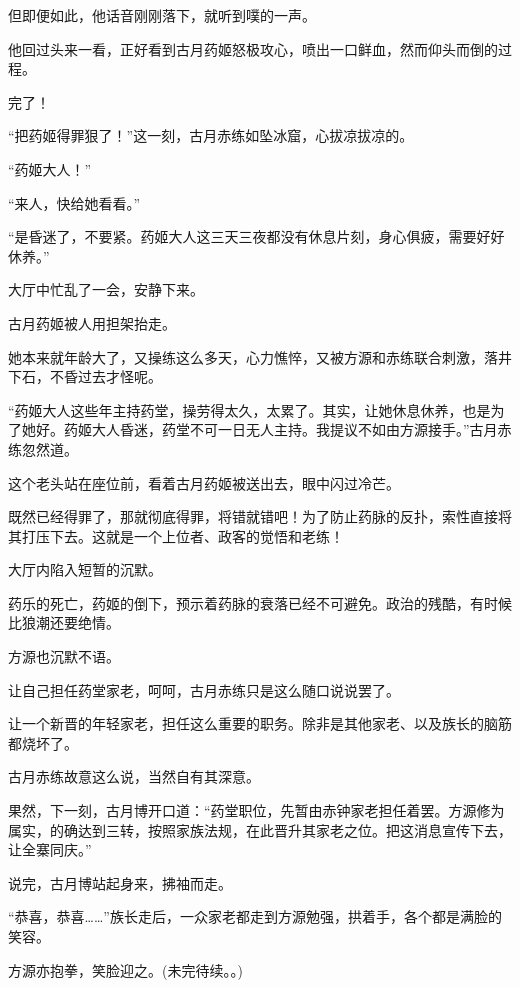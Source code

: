 \begin{this_body}
但即便如此，他话音刚刚落下，就听到噗的一声。

他回过头来一看，正好看到古月药姬怒极攻心，喷出一口鲜血，然而仰头而倒的过程。

完了！

“把药姬得罪狠了！”这一刻，古月赤练如坠冰窟，心拔凉拔凉的。

“药姬大人！”

“来人，快给她看看。”

“是昏迷了，不要紧。药姬大人这三天三夜都没有休息片刻，身心俱疲，需要好好休养。”

大厅中忙乱了一会，安静下来。

古月药姬被人用担架抬走。

她本来就年龄大了，又操练这么多天，心力憔悴，又被方源和赤练联合刺激，落井下石，不昏过去才怪呢。

“药姬大人这些年主持药堂，操劳得太久，太累了。其实，让她休息休养，也是为了她好。药姬大人昏迷，药堂不可一日无人主持。我提议不如由方源接手。”古月赤练忽然道。

这个老头站在座位前，看着古月药姬被送出去，眼中闪过冷芒。

既然已经得罪了，那就彻底得罪，将错就错吧！为了防止药脉的反扑，索性直接将其打压下去。这就是一个上位者、政客的觉悟和老练！

大厅内陷入短暂的沉默。

药乐的死亡，药姬的倒下，预示着药脉的衰落已经不可避免。政治的残酷，有时候比狼潮还要绝情。

方源也沉默不语。

让自己担任药堂家老，呵呵，古月赤练只是这么随口说说罢了。

让一个新晋的年轻家老，担任这么重要的职务。除非是其他家老、以及族长的脑筋都烧坏了。

古月赤练故意这么说，当然自有其深意。

果然，下一刻，古月博开口道：“药堂职位，先暂由赤钟家老担任着罢。方源修为属实，的确达到三转，按照家族法规，在此晋升其家老之位。把这消息宣传下去，让全寨同庆。”

说完，古月博站起身来，拂袖而走。

“恭喜，恭喜……”族长走后，一众家老都走到方源勉强，拱着手，各个都是满脸的笑容。

方源亦抱拳，笑脸迎之。(未完待续。。)

\end{this_body}

